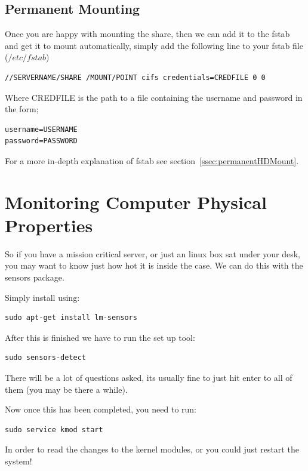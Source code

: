 \subsection{Permanent Mounting}

Once you are happy with mounting the share, then we can add it to the fstab and get it to mount automatically, simply add the following line to your fstab file ($/etc/fstab$)

\begin{verbatim}
//SERVERNAME/SHARE /MOUNT/POINT cifs credentials=CREDFILE 0 0
\end{verbatim}

Where CREDFILE is the path to a file containing the username and password in the form;

\begin{verbatim}
username=USERNAME
password=PASSWORD
\end{verbatim}

For a more in-depth explanation of fstab see section~\ref{ssec:permanentHDMount}.


\section{Monitoring Computer Physical Properties}
\label{sec:physicalmon}

So if you have a mission critical server, or just an linux box sat under your desk, you may want to know just how hot it is inside the case.  We can do this with the sensors package.

Simply install using:

\begin{lstlisting}
sudo apt-get install lm-sensors
\end{lstlisting}

After this is finished we have to run the set up tool:

\begin{lstlisting}
sudo sensors-detect
\end{lstlisting}

There will be a lot of questions asked, its usually fine to just hit enter to all of them (you may be there a while).

Now once this has been completed, you need to run:

\begin{lstlisting}
sudo service kmod start
\end{lstlisting}

In order to read the changes to the kernel modules, or you could just restart the system!

